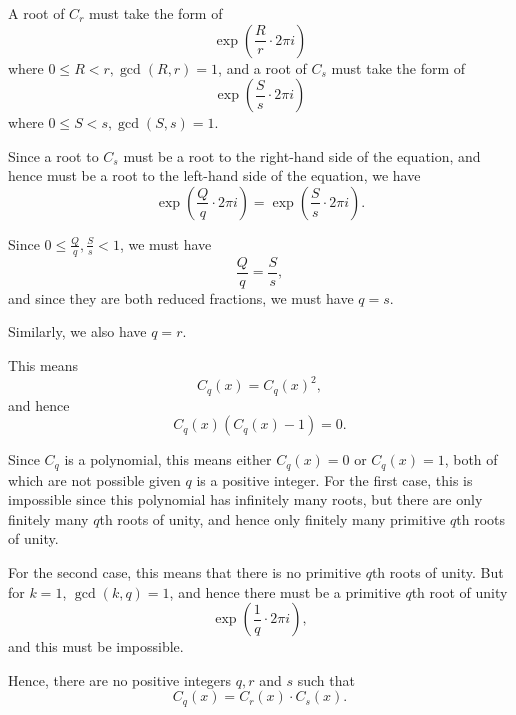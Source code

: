 \begin{enumerate}
          A root of \(C_r\) must take the form of
          \[
              \exp \left(\frac{R}{r} \cdot 2\pi i\right)
          \]
          where \(0 \leq R < r, \gcd(R, r) = 1\), and a root of \(C_s\) must take the form of
          \[
              \exp \left(\frac{S}{s} \cdot 2\pi i\right)
          \]
          where \(0 \leq S < s, \gcd(S, s) = 1\).

          Since a root to \(C_s\) must be a root to the right-hand side of the equation, and hence must be a root to the left-hand side of the equation, we have
          \[
              \exp \left(\frac{Q}{q} \cdot 2\pi i\right) = \exp \left(\frac{S}{s} \cdot 2\pi i\right).
          \]

          Since \(0 \leq \frac{Q}{q}, \frac{S}{s} < 1\), we must have
          \[
              \frac{Q}{q} = \frac{S}{s},
          \]
          and since they are both reduced fractions, we must have \(q = s\).

          Similarly, we also have \(q = r\).

          This means
          \[
              C_q(x) = C_q(x)^2,
          \]
          and hence
          \[
              C_q(x) (C_q(x) - 1) = 0.
          \]

          Since \(C_q\) is a polynomial, this means either \(C_q(x) = 0\) or \(C_q(x) = 1\), both of which are not possible given \(q\) is a positive integer. For the first case, this is impossible since this polynomial has infinitely many roots, but there are only finitely many \(q\)th roots of unity, and hence only finitely many primitive \(q\)th roots of unity.

          For the second case, this means that there is no primitive \(q\)th roots of unity. But for \(k = 1\), \(\gcd(k, q) = 1\), and hence there must be a primitive \(q\)th root of unity
          \[
              \exp \left(\frac{1}{q} \cdot 2\pi i\right),
          \]
          and this must be impossible.

          Hence, there are no positive integers \(q, r\) and \(s\) such that
          \[
              C_q(x) = C_r(x) \cdot C_s(x).
          \]
\end{enumerate}